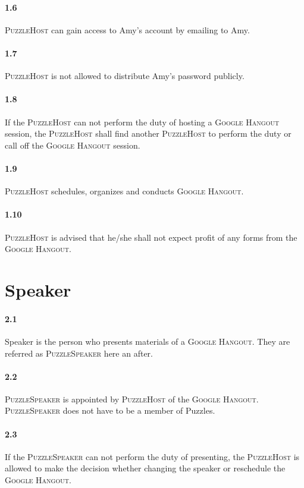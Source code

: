 \documentclass{article}
\newcommand{\hangout}{\textsc{Google Hangout}\xspace}
\newcommand{\host}{\textsc{PuzzleHost}\xspace}
\newcommand{\speaker}{\textsc{PuzzleSpeaker}\xspace}
\begin{document}
\paragraph{1.6} \host can gain access to Amy's account by emailing to Amy.

\paragraph{1.7} \host is not allowed to distribute Amy's password publicly.

\paragraph{1.8} If the \host can not perform the duty of hosting a \hangout session, the \host shall find another \host to perform the duty or call off the \hangout session.

\paragraph{1.9} \host schedules, organizes and conducts \hangout.

\paragraph{1.10} \host is advised that he/she shall not expect profit of any forms from the \hangout.

\clearpage
\section{Speaker}

\paragraph{2.1} Speaker is the person who presents materials of a \hangout. They are referred as \speaker here an after.

\paragraph{2.2} \speaker is appointed by \host of the \hangout. \speaker does not have to be a member of Puzzles.

\paragraph{2.3} If the \speaker can not perform the duty of presenting, the \host is allowed to make the decision whether changing the speaker or reschedule the \hangout.
\end{document}
